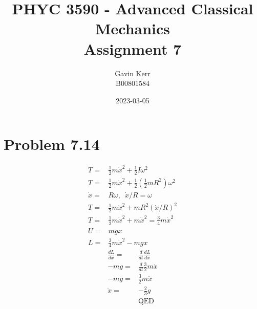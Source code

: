 \documentclass[12pt, a4paper]{article}
\title{PHYC 3590 - Advanced Classical Mechanics\\Assignment 7}
\author{Gavin Kerr\\B00801584}
\date{2023-03-05}
\begin{document}
\maketitle
\section*{Problem 7.14}
\begin{align*}
T =& \tfrac{1}{2}m\dot{x}^2 + \tfrac{1}{2}I\omega^2
\\
T =& \tfrac{1}{2}m\dot{x}^2 + \tfrac{1}{2}(\tfrac{1}{2}mR^2)\omega^2
\\
\dot{x} =& R \omega, \,\,\, \dot{x}/R = \omega
\\
T =& \tfrac{1}{2}m\dot{x}^2 + mR^2(\dot{x}/R)^2
\\
T =& \tfrac{1}{2}m\dot{x}^2 + m\dot{x}^2 = \boxed{\tfrac{3}{4}m\dot{x}^2}
\\
U =& mgx
\\
L =& \tfrac{3}{4}m\dot{x}^2 - mgx
\end{align*}
\begin{align*}
\frac{dL}{dx} =& \frac{d}{dt}\frac{dL}{d\dot{x}}
\\
-mg =& \frac{d}{dt}\frac{3}{2}m\dot{x}
\\
-mg =& \frac{3}{2}m\ddot{x}
\\
\ddot{x} =& \boxed{-\frac{2}{3}g}
\\
&\text{QED}
\end{align*}
\pagebreak
\end{document}
